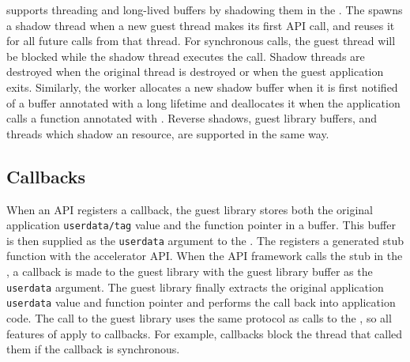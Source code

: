 \Model supports threading and long-lived buffers by shadowing them in the \worker.
The \worker spawns a shadow thread when a new guest thread makes its first API call, and reuses it for all future calls from that thread.
For synchronous calls, the guest thread will be blocked while the shadow thread executes the call.
Shadow threads are destroyed when the original thread is destroyed or when the guest application exits.
Similarly, the worker allocates a new shadow buffer when it is first notified of a buffer annotated with a long lifetime and
deallocates it when the application calls a function annotated with \lstinline@deallocates@.
Reverse shadows, guest library buffers, and threads which shadow an \worker resource, are supported in the same way.

\subsection{Callbacks}
\label{s:callback}

When an API registers a callback, the guest library stores both the original application \texttt{userdata/tag} value and the function pointer in a buffer.
This buffer is then supplied as the \texttt{userdata} argument to the \worker.
The \worker registers a generated stub function with the accelerator API.
When the API framework calls the stub in the \worker, a callback is made to the guest library with the guest library buffer as the \texttt{userdata} argument.
The guest library finally extracts the original application \texttt{userdata} value and function pointer and performs the call back into application code.
The call to the guest library uses the same protocol as calls to the \worker, so all features of \model apply to callbacks.
For example, callbacks block the \worker thread that called them if the callback is synchronous.


